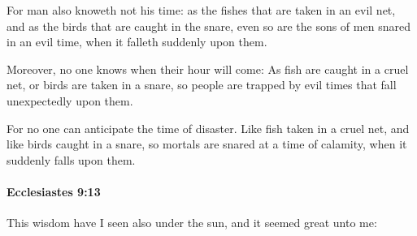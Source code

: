 			\begin{versebox}
					\item[BHS] 
					\item[LXX] 
					\item[ASV] For man also knoweth not his time: as the fishes that are taken in an evil net, and as the birds that are caught in the snare, even so are the sons of men snared in an evil time, when it falleth suddenly upon them.
					\item[NIV] Moreover, no one knows when their hour will come: As fish are caught in a cruel net, or birds are taken in a snare, so people are trapped by evil times that fall unexpectedly upon them.
					\item[NRSV] For no one can anticipate the time of disaster. Like fish taken in a cruel net, and like birds caught in a snare, so mortals are snared at a time of calamity, when it suddenly falls upon them.
			\end{versebox}

		\paragraph{Ecclesiastes 9:13} %
			\label{ECCLESIASTES-9-13}

			This wisdom have I seen also under the sun, and it seemed great unto me:

